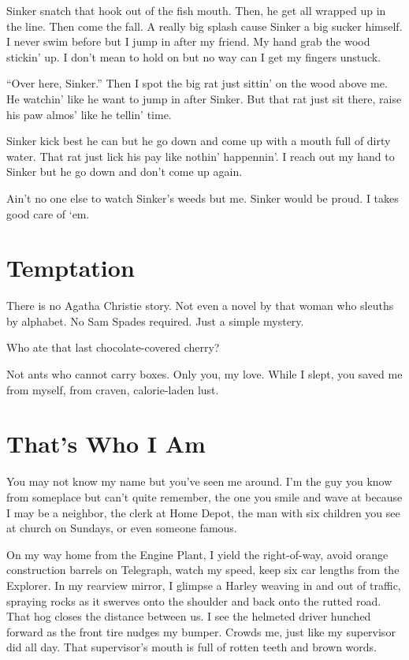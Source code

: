 \documentclass[twoside,10pt]{book}
\begin{document}
Sinker snatch that hook out of the fish mouth. Then, he get all wrapped
up in the line. Then come the fall. A really big splash cause Sinker a
big sucker himself. I never swim before but I jump in after my friend.
My hand grab the wood stickin' up. I don't mean to hold on but no way
can I get my fingers unstuck.

``Over here, Sinker.'' Then I spot the big rat just sittin' on the wood
above me. He watchin' like he want to jump in after Sinker. But that rat
just sit there, raise his paw almos' like he tellin' time.

Sinker kick best he can but he go down and come up with a mouth full of
dirty water. That rat just lick his pay like nothin' happennin'. I reach
out my hand to Sinker but he go down and don't come up again.

Ain't no one else to watch Sinker's weeds but me. Sinker would be proud.
I takes good care of `em.



\cleardoublepage
\chapter{Temptation}

There is no Agatha Christie story. Not even a novel by that woman who
sleuths by alphabet. No Sam Spades required. Just a simple mystery.

Who ate that last chocolate-covered cherry?

Not ants who cannot carry boxes. Only you, my love. While I slept, you
saved me from myself, from craven, calorie-laden lust.



\cleardoublepage
\chapter{That's Who I Am}

You may not know my name but you've seen me around. I'm the guy you know
from some­place but can't quite remember, the one you smile and wave at
because I may be a neighbor, the clerk at Home Depot, the man with six
children you see at church on Sundays, or even someone famous.

On my way home from the Engine Plant, I yield the right-of-way, avoid
orange construction barrels on Telegraph, watch my speed, keep six car
lengths from the Explorer. In my rearview mirror, I glimpse a Harley
weaving in and out of traffic, spraying rocks as it swerves onto the
shoulder and back onto the rutted road. That hog closes the distance
between us. I see the helmeted driver hunched forward as the front tire
nudges my bumper. Crowds me, just like my supervisor did all day. That
supervisor's mouth is full of rotten teeth and brown words.
\end{document}
